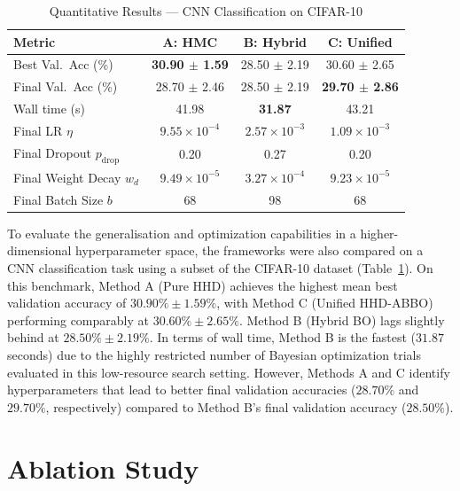 \documentclass[11pt]{article}
\begin{document}
\begin{table}[H]
\centering
\caption{Quantitative Results --- CNN Classification on CIFAR-10}
\label{tab:cifar10_results}
\renewcommand{\arraystretch}{1.25}
\begin{tabular}{lccc}
\toprule
\textbf{Metric}     & \textbf{A: HMC} & \textbf{B: Hybrid} & \textbf{C: Unified} \\
\midrule
Best Val.\ Acc (\%) & \textbf{30.90 $\pm$ 1.59} & 28.50 $\pm$ 2.19 & 30.60 $\pm$ 2.65 \\
Final Val.\ Acc (\%) & 28.70 $\pm$ 2.46 & 28.50 $\pm$ 2.19 & \textbf{29.70 $\pm$ 2.86} \\
Wall time (s)       & 41.98 & \textbf{31.87} & 43.21 \\
Final LR $\eta$     & $9.55\!\times\!10^{-4}$ & $2.57\!\times\!10^{-3}$ & $1.09\!\times\!10^{-3}$ \\
Final Dropout $p_{\mathrm{drop}}$ & 0.20 & 0.27 & 0.20 \\
Final Weight Decay $w_d$ & $9.49\!\times\!10^{-5}$ & $3.27\!\times\!10^{-4}$ & $9.23\!\times\!10^{-5}$ \\
Final Batch Size $b$ & 68 & 98 & 68 \\
\bottomrule
\end{tabular}
\end{table}

To evaluate the generalisation and optimization capabilities in a higher-dimensional hyperparameter space, the frameworks were also compared on a CNN classification task using a subset of the CIFAR-10 dataset (Table~\ref{tab:cifar10_results}). On this benchmark, Method A (Pure HHD) achieves the highest mean best validation accuracy of $30.90\% \pm 1.59\%$, with Method C (Unified HHD-ABBO) performing comparably at $30.60\% \pm 2.65\%$. Method B (Hybrid BO) lags slightly behind at $28.50\% \pm 2.19\%$. In terms of wall time, Method B is the fastest ($31.87$ seconds) due to the highly restricted number of Bayesian optimization trials evaluated in this low-resource search setting. However, Methods A and C identify hyperparameters that lead to better final validation accuracies ($28.70\%$ and $29.70\%$, respectively) compared to Method B's final validation accuracy ($28.50\%$).


\section{Ablation Study}
\label{sec:ablation}
\end{document}
